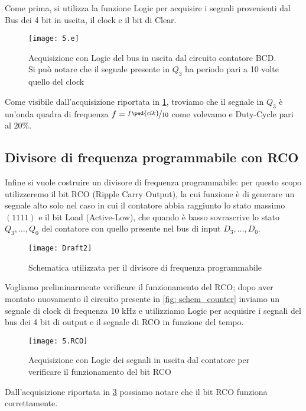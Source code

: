 \documentclass[10pt, a4paper, italian]{article}
\begin{document}
Come prima, si utilizza la funzione Logic per acquisire i segnali provenienti
dal Bus dei 4 bit in uscita, il clock e il bit di Clear.
\begin{figure}[htbp]
\centering
	\texttt{[image: 5.e]}
	\caption{Acquisizione con Logic del bus in uscita dal circuito contatore BCD.
	Si può notare che il segnale presente in $Q_3$ ha periodo pari a 10 volte
	quello del clock \label{fig: Count_10th}}
\end{figure}

Come visibile dall'acquisizione riportata in \cref{fig: Count_10th}, troviamo
che il segnale in $Q_3$ è un'onda quadra di frequenza
$f = \nicefrac{f\ped{clk}}{10}$ come volevamo e Duty-Cycle pari al
$20 \percent$.

\subsection{Divisore di frequenza programmabile con RCO}
Infine si vuole costruire un divisore di frequenza programmabile:
per questo scopo utilizzeremo il bit RCO (Ripple Carry Output), la cui
funzione è di generare un segnale alto solo nel caso in cui il contatore abbia
raggiunto lo stato massimo $(1111)$ e il bit Load (Active-Low), che quando
è basso sovrascrive lo stato $Q_3, \ldots, Q_0$ del contatore con quello
presente nel bus di input $D_3, \ldots, D_0$. 
\begin{figure}[htbp]
\centering
	\texttt{[image: Draft2]}
	\caption{Schematica utilizzata per il divisore di frequenza programmabile
	\label{schem: programmable_counter}}
\end{figure}

Vogliamo preliminarmente verificare il funzionamento del RCO; dopo aver
montato nuovamento il circuito presente in \cref{fig: schem_counter} inviamo
un segnale di clock di frequenza 10 kHz e utilizziamo Logic per acquisire i
segnali del bus dei 4 bit di output e il segnale di RCO in funzione del tempo.
\begin{figure}[htbp]
\centering
	\texttt{[image: 5.RCO]}
	\label{fig: RCO_f}
	\caption{Acquisizione con Logic dei segnali in uscita dal contatore per
	verificare il funzionamento del bit RCO}
\end{figure}
Dall'acquisizione riportata in \cref{fig: RCO_f} possiamo notare che il bit
RCO funziona correttamente.
\end{document}
